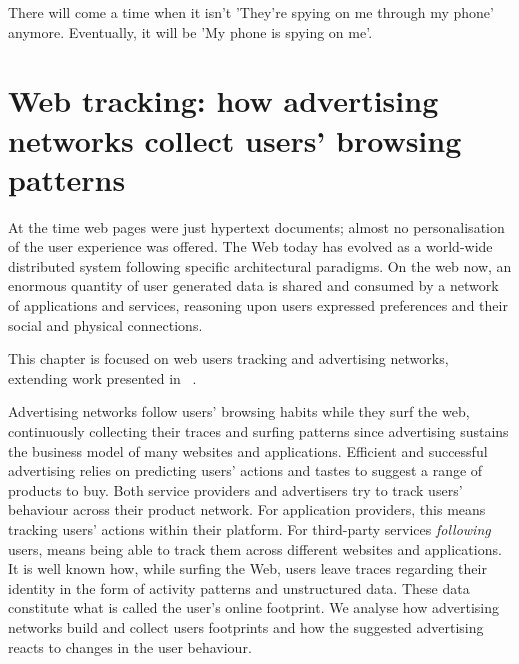 \begin{savequote}[75mm]
There will come a time when it isn't 'They're spying on me through my phone' anymore. Eventually, it will be 'My phone is spying on me'.
\end{savequote}

\chapter{Web tracking: how advertising networks collect users' browsing patterns}

 At the time web pages were just hypertext documents; almost no personalisation of the user experience was offered. The Web today has evolved as a world-wide distributed system following specific architectural paradigms. On the web now, an enormous quantity of user generated data is shared and consumed by a network of applications and services, reasoning upon users expressed preferences and their social and physical connections. 

This chapter is focused on web users tracking and advertising networks, extending work presented in ~\cite{puglisi2016web, puglisi2015you, puglisi2017web}.

Advertising networks follow users' browsing habits while they surf the web, continuously collecting their traces and surfing patterns since advertising sustains the business model of many websites and applications. Efficient and successful advertising relies on predicting users' actions and tastes to suggest a range of products to buy. Both service providers and advertisers try to track users' behaviour across their product network. For application providers, this means tracking users' actions within their platform. For third-party services \emph{following} users, means being able to track them across different websites and applications. It is well known how, while surfing the Web, users leave traces regarding their identity in the form of activity patterns and unstructured data. These data constitute what is called the user's online footprint. We analyse how advertising networks build and collect users footprints and how the suggested advertising reacts to changes in the user behaviour.

